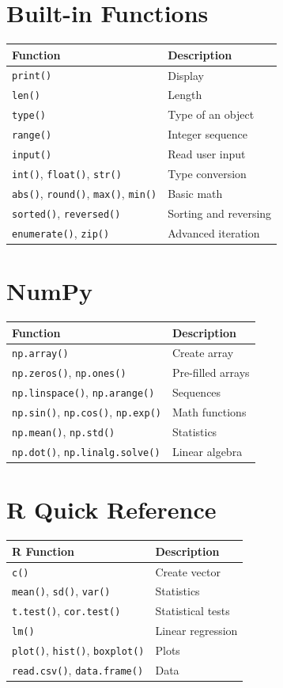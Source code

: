 \documentclass[12pt,a4paper,twoside]{book}
\theoremstyle{definition}
\theoremstyle{remark}
\newcommand{\py}[1]{\texttt{#1}}
\newcommand{\ri}[1]{\texttt{#1}}
\begin{document}
\section{Built-in Functions}
\begin{tabular}{ll}
\toprule
\textbf{Function} & \textbf{Description} \\
\midrule
\py{print()} & Display \\
\py{len()} & Length \\
\py{type()} & Type of an object \\
\py{range()} & Integer sequence \\
\py{input()} & Read user input \\
\py{int()}, \py{float()}, \py{str()} & Type conversion \\
\py{abs()}, \py{round()}, \py{max()}, \py{min()} & Basic math \\
\py{sorted()}, \py{reversed()} & Sorting and reversing \\
\py{enumerate()}, \py{zip()} & Advanced iteration \\
\bottomrule
\end{tabular}

\section{NumPy}
\begin{tabular}{ll}
\toprule
\textbf{Function} & \textbf{Description} \\
\midrule
\py{np.array()} & Create array \\
\py{np.zeros()}, \py{np.ones()} & Pre-filled arrays \\
\py{np.linspace()}, \py{np.arange()} & Sequences \\
\py{np.sin()}, \py{np.cos()}, \py{np.exp()} & Math functions \\
\py{np.mean()}, \py{np.std()} & Statistics \\
\py{np.dot()}, \py{np.linalg.solve()} & Linear algebra \\
\bottomrule
\end{tabular}

\section{R Quick Reference}
\begin{tabular}{ll}
\toprule
\textbf{R Function} & \textbf{Description} \\
\midrule
\ri{c()} & Create vector \\
\ri{mean()}, \ri{sd()}, \ri{var()} & Statistics \\
\ri{t.test()}, \ri{cor.test()} & Statistical tests \\
\ri{lm()} & Linear regression \\
\ri{plot()}, \ri{hist()}, \ri{boxplot()} & Plots \\
\ri{read.csv()}, \ri{data.frame()} & Data \\
\bottomrule
\end{tabular}
\end{document}
